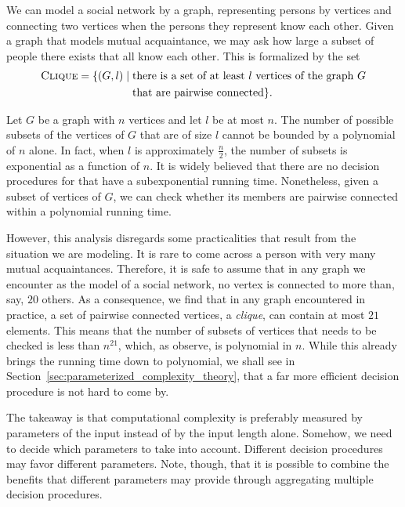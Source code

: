 \begin{example}
  We can model a social network by a graph, representing persons by vertices and connecting two vertices when the persons they represent know each other.
  Given a graph that models mutual acquaintance, we may ask how large a subset of people there exists that all know each other.
  This is formalized by the set
  \begin{align*}
    \textnormal{\textsc{Clique}} = \{(G, l) \;|\; &\text{there is a set of at least $l$ vertices of the graph $G$} \\
    	&\text{that are pairwise connected}\}.
  \end{align*}

  Let $G$ be a graph with $n$ vertices and let $l$ be at most $n$.
  The number of possible subsets of the vertices of $G$ that are of size $l$ cannot be bounded by a polynomial of $n$ alone.
  In fact, when $l$ is approximately $\frac{n}{2}$, the number of subsets is exponential as a function of $n$.
  It is widely believed that there are no decision procedures for  that have a subexponential running time.
  Nonetheless, given a subset of vertices of $G$, we can check whether its members are pairwise connected within a polynomial running time.

  However, this analysis disregards some practicalities that result from the situation we are modeling.
  It is rare to come across a person with very many mutual acquaintances.
  Therefore, it is safe to assume that in any graph we encounter as the model of a social network, no vertex is connected to more than, say, $20$ others.
  As a consequence, we find that in any graph encountered in practice, a set of pairwise connected vertices, a \emph{clique}, can contain at most $21$ elements.
  This means that the number of subsets of vertices that needs to be checked is less than $n^{21}$, which, as \citeauthor{garey1979computers} observe, is polynomial in $n$.
  While this already brings the running time down to polynomial, we shall see in Section~\ref{sec:parameterized_complexity_theory}, that a far more efficient decision procedure is not hard to come by.
\end{example}

The takeaway is that computational complexity is preferably measured by parameters of the input instead of by the input length alone.
Somehow, we need to decide which parameters to take into account.
Different decision procedures may favor different parameters.
Note, though, that it is possible to combine the benefits that different parameters may provide through aggregating multiple decision procedures.

